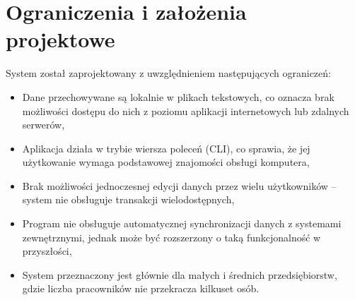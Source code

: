\section{Ograniczenia i założenia projektowe}
\noindent System został zaprojektowany z uwzględnieniem następujących ograniczeń:
\begin{itemize}
    \item Dane przechowywane są lokalnie w plikach tekstowych, co oznacza brak możliwości dostępu do nich z poziomu aplikacji internetowych lub zdalnych serwerów,
    \item Aplikacja działa w trybie wiersza poleceń (CLI), co sprawia, że jej użytkowanie wymaga podstawowej znajomości obsługi komputera,
    \item Brak możliwości jednoczesnej edycji danych przez wielu użytkowników – system nie obsługuje transakcji wielodostępnych,
    \item Program nie obsługuje automatycznej synchronizacji danych z systemami zewnętrznymi, jednak może być rozszerzony o taką funkcjonalność w przyszłości,
    \item System przeznaczony jest głównie dla małych i średnich przedsiębiorstw, gdzie liczba pracowników nie przekracza kilkuset osób.
\end{itemize}